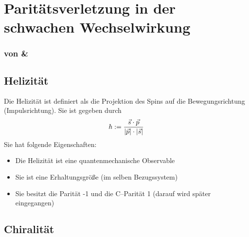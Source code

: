 \documentclass[Ex4_Zusammenfassung.tex]{subfiles}
\begin{document}
\section{Paritätsverletzung in der schwachen Wechselwirkung}
\subsubsection*{von \mitsch \& \anton}


\subsection{Helizität}
Die Helizität ist definiert als die Projektion des Spins auf die Bewegungsrichtung (Impulsrichtung). Sie ist gegeben durch
\begin{equation}
	h:=\frac{\vec{s}\cdot \vec{p}}{\left\vert \vec{p} \right\vert\cdot \left\vert \vec{s} \right\vert}
\end{equation}
Sie hat folgende Eigenschaften:
\begin{itemize}
	\item Die Helizität ist eine quantenmechanische Observable
	\item Sie ist eine Erhaltungsgröße (im selben Bezugssystem)
	\item Sie besitzt die Parität -1 und die C--Parität 1 (darauf wird später eingegangen)
\end{itemize}

\subsection{Chiralität}

	
	
\end{document}
